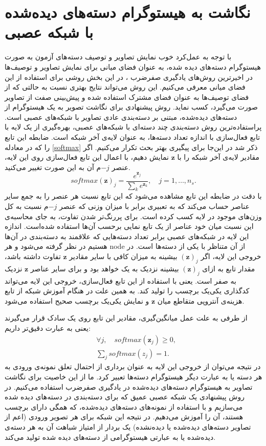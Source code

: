 \section{نگاشت به هیستوگرام دسته‌های دیده‌شده با شبکه عصبی} \label{hist}
با توجه به عمل‌کرد خوب نمایش تصاویر و توصیف دسته‌های آزمون به صورت  هیستوگرام دسته‌های دیده شده، به عنوان  فضای میانی برای نمایش تصاویر و توصیف‌ها  در اخیرترین روش‌های یادگیری صفرضرب  \cite{sse}،
در این بخش روشی برای استفاده از این فضای میانی معرفی می‌کنیم. این روش می‌تواند نتایج بهتری نسبت به حالتی که از فضای توصیف‌ها به عنوان فضای مشترک استفاده شده و پیش‌بینی صفت از تصاویر صورت می‌گیرد، کسب نماید.
 روش پیشنهادی برای نگاشت تصویر به یک هیستوگرام از دسته‌های دیده‌شده، مبتنی بر دسته‌بندی عادی تصاویر با شبکه‌های عصبی است. پراستفاده‌ترین روش دسته‌بندی چند دسته‌ای با شبکه‌های عصبی، بهره‌گیری از یک لایه با تابع فعال‌سازی  با اندازه تعداد دسته‌ها، به عنوان لایه‌ی آخر شبکه است. ضابطه این تابع را که در معادله \eqref{softmax} ذکر شد در این‌جا برای پیگیری بهتر بحث تکرار می‌کنیم. اگر مقادیر لایه‌ی آخر شبکه را با $\mathbf{z} $ نمایش دهیم، با اعمال این تابع فعال‌سازی روی این لایه، عنصر $-j$م آن به این صورت تغییر می‌کنید.
 \begin{equation*}
 softmax(\mathbf{z} )_j = \frac{e^{\mathbf{z} _j}}{\sum_k e^{\mathbf{z} _k}}, \quad j = 1, \ldots, n_s.
 \end{equation*}
با دقت در ضابطه این تابع مشاهده می‌شود که این تابع نسبت هر عنصر را به جمع سایر عناصر حساب می‌کند که به تعبیری برابر با میزان وزنی که عنصر $-j$م نسبت به کل وزن‌های موجود در لایه کسب کرده است.
 برای پررنگ‌تر شدن تفاوت، به جای محاسبه‌ی این نسبت میان خود عناصر از یک تابع نمایی برحسب آن‌ها استفاده شده‌است. اندازه این لایه در شبکه‌های عصبی برابر تعداد دسته‌هایی که علاقمند به دسته‌بندی در ‌آن‌ها هستیم در نظر گرفته می‌شود و هر
\gls{node}
از آن متناظر با یکی از دسته‌ها است. در خروجی این لایه، اگر $(\mathbf{z} )_j$ بیشینه به میزان کافی با سایر مقادیر $\mathbf{z} $ تفاوت داشته باشد، مقدار تابع به ازای  $(\mathbf{z} )_j$ بیشینه نزدیک به یک خواهد بود  و برای سایر عناصر $\mathbf{z} $ نزدیک به صفر است. یعنی با استفاده از این تابع فعال‌سازی، خروجی این لایه می‌تواند کدگذاری یکی‌یک برچسب را تولید کند. به همین علت در هنگام آموزش شبکه از تابع هزینه‌ی آنتروپی متقاطع میان $\mathbf{z} $ و نمایش یکی‌یک برچسب صحیح استفاده می‌شود.

از طرفی به علت عمل میانگین‌گیری، مقادیر این تابع روی یک سادک قرار می‌گیرند یعنی به عبارت دقیق‌تر داریم:
\begin{align}
&\forall j, \quad softmax(\mathbf{z} _j) \geq 0, \\
& \sum_j softmax(z_j) = 1.
\end{align}
در نتیجه می‌توان از خروجی این لایه به عنوان برداری از احتمال تعلق نمونه‌ی ورودی به هر دسته یا به عبارت دیگر هیستوگرام دسته‌ها تعبیر کرد. ما از این خاصیت برای نگاشت تصاویر به هیستوگرام دسته‌های دیده‌شده در یادگیری صفرضرب استفاده می‌کنیم. در روش پیشنهادی یک شبکه عصبی عمیق که برای دسته‌بندی در دسته‌های دیده شده می‌سازیم و با استفاده از نمونه‌های دسته‌های دیده‌شده، که همگی دارای برچسب هستند، آن را آموزش می‌دهیم. در نتیجه این شبکه برای هر تصویر ورودی (اعم از تصاویر دسته‌های دیده‌شده یا دیده‌نشده) یک بردار از امتیاز شباهت آن به هر دسته‌ی دیده‌شده یا به عبارتی هیستوگرامی از دسته‌های دیده شده تولید می‌کند.

